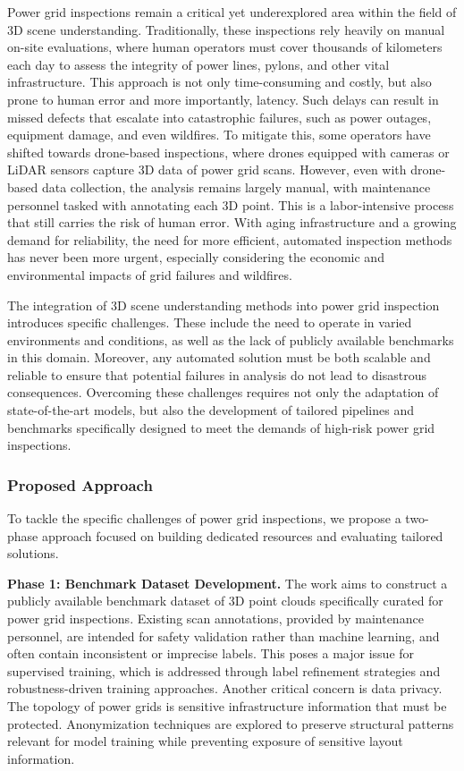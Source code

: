 Power grid inspections remain a critical yet underexplored area within the
field of 3D scene understanding.
%
Traditionally, these inspections rely heavily on manual on-site evaluations,
where human operators must cover thousands of kilometers each day to assess the
integrity of power lines, pylons, and other vital infrastructure.
%
This approach is not only time-consuming and costly, but also prone to human
error and more importantly, latency. Such delays can result in missed defects
that escalate into catastrophic failures, such as power outages, equipment
damage, and even wildfires.
%
To mitigate this, some operators have shifted towards drone-based inspections,
where drones equipped with cameras or LiDAR sensors capture 3D data of power
grid scans.
%
However, even with drone-based data collection, the analysis remains largely
manual, with maintenance personnel tasked with annotating each 3D point. This
is a labor-intensive process that still carries the risk of human error. With
aging infrastructure and a growing demand for reliability, the need for more
efficient, automated inspection methods has never been more urgent, especially
considering the economic and environmental impacts of grid failures and
wildfires.

%
The integration of 3D scene understanding methods into power grid inspection
introduces specific challenges. These include the need to operate in varied
environments and conditions, as well as the lack of publicly available
benchmarks in this domain.
%
Moreover, any automated solution must be both scalable and reliable to ensure
that potential failures in analysis do not lead to disastrous consequences.
%
Overcoming these challenges requires not only the adaptation of
state-of-the-art models, but also the development of tailored pipelines and
benchmarks specifically designed to meet the demands of high-risk power grid
inspections.

\subsubsection{Proposed Approach}
%
%
To tackle the specific challenges of power grid inspections, we propose a
two-phase approach focused on building dedicated resources and evaluating
tailored solutions.

\textbf{Phase 1: Benchmark Dataset Development.} The work
aims to construct a publicly available benchmark dataset of 3D point clouds
specifically curated for power grid inspections. Existing scan annotations,
provided by maintenance personnel, are intended for safety validation rather
than machine learning, and often contain inconsistent or imprecise labels. This
poses a major issue for supervised training, which is addressed through label
refinement strategies and robustness-driven training approaches.
%
Another critical concern is data privacy. The topology of power grids is
sensitive infrastructure information that must be protected. Anonymization
techniques are explored to preserve structural patterns relevant for model
training while preventing exposure of sensitive layout information.


